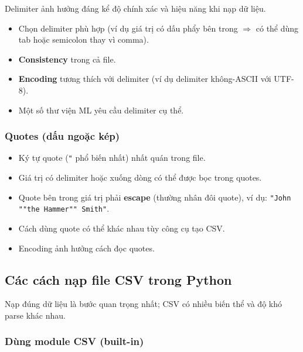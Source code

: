 \begin{luuy}[title={Ảnh hưởng tới mô hình}]
Delimiter ảnh hưởng đáng kể độ chính xác và hiệu năng khi nạp dữ liệu.
\begin{itemize}
  \item Chọn delimiter phù hợp (ví dụ giá trị có dấu phẩy bên trong $\Rightarrow$ có thể dùng tab hoặc semicolon thay vì comma).
  \item \textbf{Consistency} trong cả file.
  \item \textbf{Encoding} tương thích với delimiter (ví dụ delimiter không-ASCII với UTF-8).
  \item Một số thư viện ML yêu cầu delimiter cụ thể.
\end{itemize}
\end{luuy}

\subsubsection{Quotes (dấu ngoặc kép)}

\begin{phuongphap}[title={Lưu ý khi dùng quotes}]
\begin{itemize}
  \item Ký tự quote (\texttt{"} phổ biến nhất) nhất quán trong file.
  \item Giá trị có delimiter hoặc xuống dòng có thể được bọc trong quotes.
  \item Quote bên trong giá trị phải \textbf{escape} (thường nhân đôi quote), ví dụ: \texttt{"John ""the Hammer"" Smith"}.
  \item Cách dùng quote có thể khác nhau tùy công cụ tạo CSV.
  \item Encoding ảnh hưởng cách đọc quotes.
\end{itemize}
\end{phuongphap}

\subsection{Các cách nạp file CSV trong Python}

\begin{ynghia}[title={Nhiệm vụ then chốt}]
Nạp đúng dữ liệu là bước quan trọng nhất; CSV có nhiều biến thể và độ khó parse khác nhau.
\end{ynghia}

\subsubsection{Dùng module CSV (built-in)}

